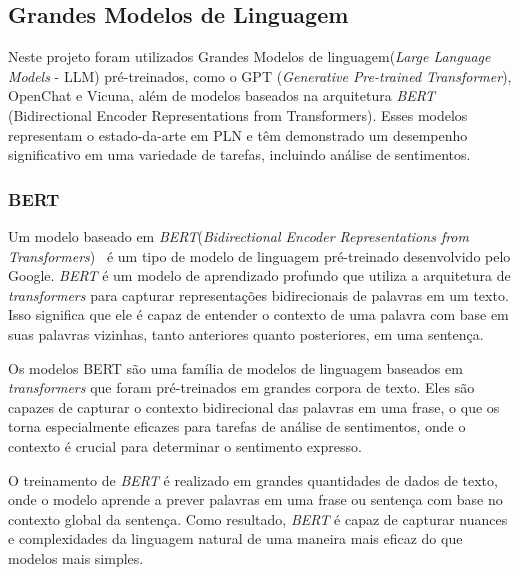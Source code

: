 \subsection{Grandes Modelos de Linguagem}
\label{cap:fund_teorica:sec:modelos}


Neste projeto foram utilizados Grandes Modelos de linguagem(\textit{Large Language Models} - LLM) pré-treinados, como o GPT (\textit{Generative Pre-trained Transformer}), OpenChat e Vicuna, além de modelos baseados na arquitetura \textit{BERT} (Bidirectional Encoder Representations from Transformers)\cite{hugoZanini2021mediu}. Esses modelos representam o estado-da-arte em PLN e têm demonstrado um desempenho significativo em uma variedade de tarefas, incluindo análise de sentimentos.

\subsubsection[BERT]{BERT}
\label{cap:fund_teorica:sec:modelos:subsec:bert}

Um modelo baseado em \textit{BERT}(\textit{Bidirectional Encoder Representations from Transformers})~\cite{devlin2019bert} é um tipo de modelo de linguagem pré-treinado desenvolvido pelo Google. \textit{BERT} é um modelo de aprendizado profundo que utiliza a arquitetura de \textit{transformers} para capturar representações bidirecionais de palavras em um texto. Isso significa que ele é capaz de entender o contexto de uma palavra com base em suas palavras vizinhas, tanto anteriores quanto posteriores, em uma sentença.

Os modelos BERT são uma família de modelos de linguagem baseados em \textit{transformers} que foram pré-treinados em grandes corpora de texto. Eles são capazes de capturar o contexto bidirecional das palavras em uma frase, o que os torna especialmente eficazes para tarefas de análise de sentimentos, onde o contexto é crucial para determinar o sentimento expresso.

O treinamento de \textit{BERT} é realizado em grandes quantidades de dados de texto, onde o modelo aprende a prever palavras em uma frase ou sentença com base no contexto global da sentença. Como resultado, \textit{BERT} é capaz de capturar nuances e complexidades da linguagem natural de uma maneira mais eficaz do que modelos mais simples.

